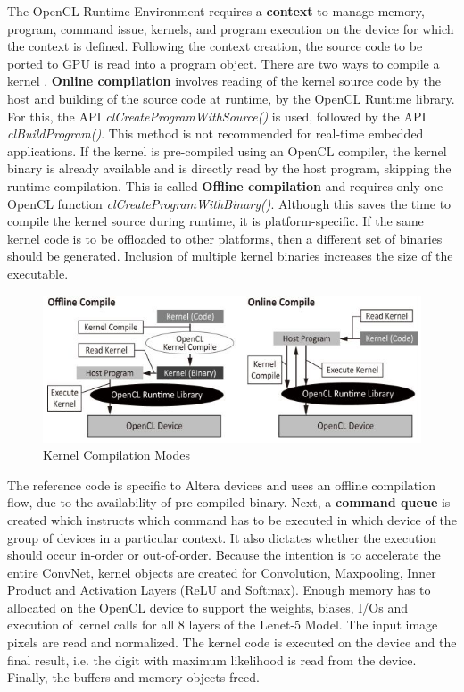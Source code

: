 The OpenCL Runtime Environment requires a \textbf{context} to manage memory, program, command issue, kernels, and program execution on the device for which the context is defined. Following the context creation, the source code to be ported to GPU is read into a program object.\newline\newline
There are two ways to compile a kernel \cite{opencl_book_html}. \textbf{Online compilation} involves reading of the kernel source code by the host and building of the source code at runtime, by the OpenCL Runtime library. For this, the API \textit{clCreateProgramWithSource()} is used, followed by the API \textit{clBuildProgram()}. This method is not recommended for real-time embedded applications. If the kernel is pre-compiled using an OpenCL compiler, the kernel binary is already available and is directly read by the host program, skipping the runtime compilation. This is called \textbf{Offline compilation} and requires only one OpenCL function \textit{clCreateProgramWithBinary()}. Although this saves the time to compile the kernel source during runtime, it is platform-specific. If the same kernel code is to be offloaded to other platforms, then a different set of binaries should be generated. Inclusion of multiple kernel binaries increases the size of the executable.
\begin{figure}[h!]
\centering
\includegraphics[width=0.7\linewidth]{figures/kernel_compilation.PNG}
\caption{Kernel Compilation Modes \cite{opencl_book_html}}
\label{fig:kernel_compilation}
\end{figure}
The reference code \cite{mnist-altera-opencl} is specific to Altera devices and uses an offline compilation flow, due to the availability of pre-compiled binary.\newline\newline
Next, a \textbf{command queue} is created which instructs which command has to be executed in which device of the group of devices in a particular context. It also dictates whether the execution should occur in-order or out-of-order. Because the intention is to accelerate the entire ConvNet, kernel objects are created for Convolution, Maxpooling, Inner Product and Activation Layers (ReLU and Softmax). Enough memory has to allocated on the OpenCL device to support the weights, biases, I/Os and execution of kernel calls for all 8 layers of the Lenet-5 Model. \newline\newline
The input image pixels are read and normalized. The kernel code is executed on the device and the final result, i.e. the digit with maximum likelihood is read from the device. Finally, the buffers and memory objects freed.
